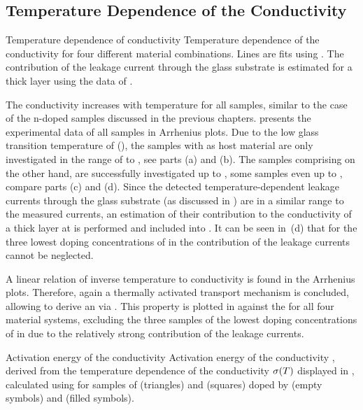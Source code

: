\subsection{Temperature Dependence of the Conductivity}%
\label{sec:ResP-CondEact}

{Temperature dependence of conductivity}
{Temperature dependence of the conductivity for four different material combinations. Lines are fits using .
The contribution of the leakage current through the glass substrate is estimated for a  thick layer using the data of .
}

The conductivity increases with temperature for all samples, similar to the case of the n-doped samples discussed in the previous chapters.  presents the experimental data of all samples in Arrhenius plots.
Due to the low glass transition temperature of \meo (\Tg[67]), the samples with \meo as host material are only investigated in the range of \T[25] to , see  parts (a) and (b). The samples comprising \lili on the other hand, are successfully investigated up to \T[70], some samples even up to , compare  parts (c) and (d).
Since the detected temperature-dependent leakage currents through the glass substrate (as discussed in ) are in a similar range to the measured currents, an estimation of their contribution to the conductivity of a  thick layer at \V[1] is performed and included into .
It can be seen in \,(d) that for the three lowest doping concentrations of \CSF in \lili the contribution of the leakage currents cannot be neglected.

A linear relation of inverse temperature to conductivity is found in the Arrhenius plots. Therefore, again a thermally activated transport mechanism is concluded, allowing to derive an \EactLong \Eact via . This property is plotted in  against the \CLong for all four material systems, excluding the three samples of the lowest doping concentrations of \CSF in \lili due to the relatively strong contribution of the leakage currents.

{Activation energy of the conductivity}%
{Activation energy of the conductivity \Eact, derived from the temperature dependence of the conductivity $\c(T)$ displayed in , calculated using  for
samples of \meo (triangles) and \lili (squares) doped by \FS (empty symbols) and \CSF (filled symbols).
}

